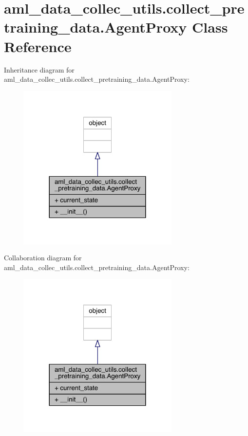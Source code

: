 \hypertarget{classaml__data__collec__utils_1_1collect__pretraining__data_1_1_agent_proxy}{}\section{aml\+\_\+data\+\_\+collec\+\_\+utils.\+collect\+\_\+pretraining\+\_\+data.\+Agent\+Proxy Class Reference}
\label{classaml__data__collec__utils_1_1collect__pretraining__data_1_1_agent_proxy}


Inheritance diagram for aml\+\_\+data\+\_\+collec\+\_\+utils.\+collect\+\_\+pretraining\+\_\+data.\+Agent\+Proxy\+:
\nopagebreak
\begin{figure}[H]
\begin{center}
\leavevmode
\includegraphics[width=228pt]{classaml__data__collec__utils_1_1collect__pretraining__data_1_1_agent_proxy__inherit__graph}
\end{center}
\end{figure}


Collaboration diagram for aml\+\_\+data\+\_\+collec\+\_\+utils.\+collect\+\_\+pretraining\+\_\+data.\+Agent\+Proxy\+:
\nopagebreak
\begin{figure}[H]
\begin{center}
\leavevmode
\includegraphics[width=228pt]{classaml__data__collec__utils_1_1collect__pretraining__data_1_1_agent_proxy__coll__graph}
\end{center}
\end{figure}
